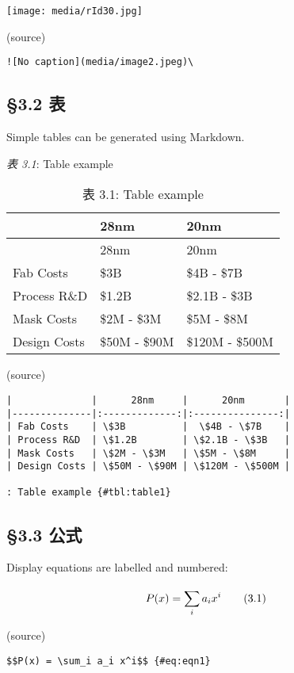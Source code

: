 \documentclass[
]{article}
\begin{document}
\texttt{[image: media/rId30.jpg]}~

(source)

\begin{verbatim}
![No caption](media/image2.jpeg)\ 
\end{verbatim}

\hypertarget{ux8868}{%
\subsection{§3.2 表}\label{ux8868}}

Simple tables can be generated using Markdown.

\emph{表 3.1}: Table example

\begin{longtable}[]{@{}lll@{}}
\caption{表 3.1: Table example}\tabularnewline
\toprule
& 28nm & 20nm\tabularnewline
\midrule
\endfirsthead
\toprule
& 28nm & 20nm\tabularnewline
\midrule
\endhead
Fab Costs & \$3B & \$4B - \$7B\tabularnewline
Process R\&D & \$1.2B & \$2.1B - \$3B\tabularnewline
Mask Costs & \$2M - \$3M & \$5M - \$8M\tabularnewline
Design Costs & \$50M - \$90M & \$120M - \$500M\tabularnewline
\bottomrule
\end{longtable}

(source)

\begin{verbatim}
|              |      28nm     |      20nm       |
|--------------|:-------------:|:---------------:|
| Fab Costs    | \$3B          |  \$4B - \$7B    |
| Process R&D  | \$1.2B        | \$2.1B - \$3B   |
| Mask Costs   | \$2M - \$3M   | \$5M - \$8M     |
| Design Costs | \$50M - \$90M | \$120M - \$500M |

: Table example {#tbl:table1}
\end{verbatim}

\hypertarget{ux516cux5f0f}{%
\subsection{§3.3 公式}\label{ux516cux5f0f}}

Display equations are labelled and numbered:

\[P(x) = \sum_{i}^{}a_{i}x^{i}\text{\quad\quad}(3.1)\]

(source)

\begin{verbatim}
$$P(x) = \sum_i a_i x^i$$ {#eq:eqn1}
\end{verbatim}
\end{document}
